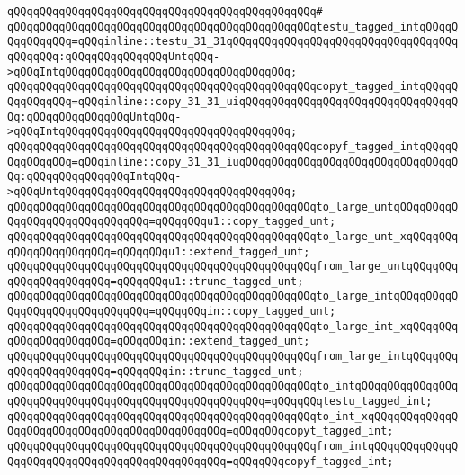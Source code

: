 \verb|qQQqqQQqqQQqqQQqqQQqqQQqqQQqqQQqqQQqqQQqqQQqqQQq#|\newline
\verb|qQQqqQQqqQQqqQQqqQQqqQQqqQQqqQQqqQQqqQQqqQQqqQQqtestu_tagged_intqQQqqQQqqQQqqQQq=qQQqinline::testu_31_31qQQqqQQqqQQqqQQqqQQqqQQqqQQqqQQqqQQqqQQqqQQq:qQQqqQQqqQQqqQQqUntqQQq->qQQqIntqQQqqQQqqQQqqQQqqQQqqQQqqQQqqQQqqQQq;|\newline
\verb|qQQqqQQqqQQqqQQqqQQqqQQqqQQqqQQqqQQqqQQqqQQqqQQqcopyt_tagged_intqQQqqQQqqQQqqQQq=qQQqinline::copy_31_31_uiqQQqqQQqqQQqqQQqqQQqqQQqqQQqqQQqqQQq:qQQqqQQqqQQqqQQqUntqQQq->qQQqIntqQQqqQQqqQQqqQQqqQQqqQQqqQQqqQQqqQQq;|\newline
\verb|qQQqqQQqqQQqqQQqqQQqqQQqqQQqqQQqqQQqqQQqqQQqqQQqcopyf_tagged_intqQQqqQQqqQQqqQQq=qQQqinline::copy_31_31_iuqQQqqQQqqQQqqQQqqQQqqQQqqQQqqQQqqQQq:qQQqqQQqqQQqqQQqIntqQQq->qQQqUntqQQqqQQqqQQqqQQqqQQqqQQqqQQqqQQqqQQq;|\newline
\newline
\verb|qQQqqQQqqQQqqQQqqQQqqQQqqQQqqQQqqQQqqQQqqQQqqQQqto_large_untqQQqqQQqqQQqqQQqqQQqqQQqqQQqqQQq=qQQqqQQqu1::copy_tagged_unt;|\newline
\verb|qQQqqQQqqQQqqQQqqQQqqQQqqQQqqQQqqQQqqQQqqQQqqQQqto_large_unt_xqQQqqQQqqQQqqQQqqQQqqQQq=qQQqqQQqu1::extend_tagged_unt;|\newline
\verb|qQQqqQQqqQQqqQQqqQQqqQQqqQQqqQQqqQQqqQQqqQQqqQQqfrom_large_untqQQqqQQqqQQqqQQqqQQqqQQq=qQQqqQQqu1::trunc_tagged_unt;|\newline
\verb|qQQqqQQqqQQqqQQqqQQqqQQqqQQqqQQqqQQqqQQqqQQqqQQqto_large_intqQQqqQQqqQQqqQQqqQQqqQQqqQQqqQQq=qQQqqQQqin::copy_tagged_unt;|\newline
\verb|qQQqqQQqqQQqqQQqqQQqqQQqqQQqqQQqqQQqqQQqqQQqqQQqto_large_int_xqQQqqQQqqQQqqQQqqQQqqQQq=qQQqqQQqin::extend_tagged_unt;|\newline
\verb|qQQqqQQqqQQqqQQqqQQqqQQqqQQqqQQqqQQqqQQqqQQqqQQqfrom_large_intqQQqqQQqqQQqqQQqqQQqqQQq=qQQqqQQqin::trunc_tagged_unt;|\newline
\verb|qQQqqQQqqQQqqQQqqQQqqQQqqQQqqQQqqQQqqQQqqQQqqQQqto_intqQQqqQQqqQQqqQQqqQQqqQQqqQQqqQQqqQQqqQQqqQQqqQQqqQQqqQQq=qQQqqQQqtestu_tagged_int;|\newline
\verb|qQQqqQQqqQQqqQQqqQQqqQQqqQQqqQQqqQQqqQQqqQQqqQQqto_int_xqQQqqQQqqQQqqQQqqQQqqQQqqQQqqQQqqQQqqQQqqQQqqQQq=qQQqqQQqcopyt_tagged_int;|\newline
\verb|qQQqqQQqqQQqqQQqqQQqqQQqqQQqqQQqqQQqqQQqqQQqqQQqfrom_intqQQqqQQqqQQqqQQqqQQqqQQqqQQqqQQqqQQqqQQqqQQqqQQq=qQQqqQQqcopyf_tagged_int;|\newline
\newline
